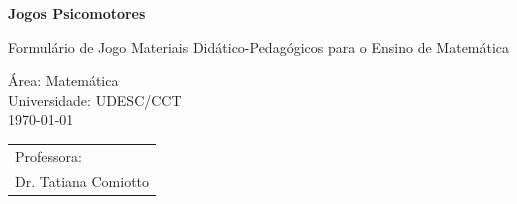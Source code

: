 \documentclass[english,ngerman,parskip=half]{scrartcl}
\begin{document}

    \begin{titlepage}
        \vspace*{-3cm}

        \vspace*{5cm}
    \begin{center}
        \Huge\bfseries\sffamily Jogos Psicomotores

        \vspace*{2cm}
        \large 
        Formulário de Jogo Materiais Didático-Pedagógicos
        para o Ensino de Matemática
    \end{center}

    \enlargethispage{3cm}
    \vfill
    \parbox[t]{0.45\textwidth}{%
                Área: Matemática \\
                    Universidade: UDESC/CCT \\
                    {\today}
                          }%
                          \hfill
                          \begin{tabular}[t]{l@{}}%
                              Professora:\\
                                Dr. Tatiana Comiotto
                              \end{tabular}
                          \end{titlepage}
\end{document}
